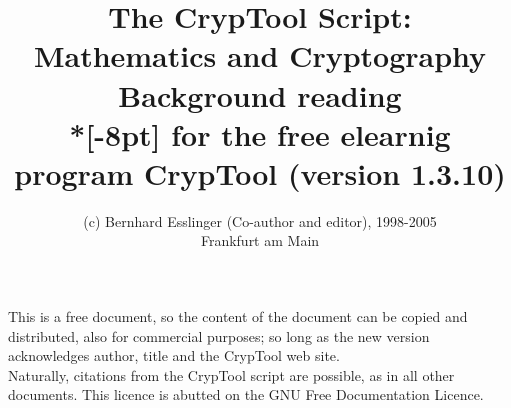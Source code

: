 \documentclass[a4paper,11pt]{article}
\title{ 
	The CrypTool Script: \\
	Mathematics and Cryptography \\
        \vspace{30pt}
        {\large	Background reading\\*[-8pt] 
        for the free elearnig program CrypTool (version 1.3.10)}
        \vspace{60pt}
}
\author{
(c) Bernhard Esslinger (Co-author and editor), 1998-2005 \\
Frankfurt am Main
}
\begin{document}
\pagestyle{plain}
\setlength{\fboxrule}{.5mm}
\setlength{\fboxsep}{1.75mm}
\setlength{\footnotesep}{6pt}
\addtolength{\footskip}{8pt}

\renewcommand\footnoterule{%
  \vspace{2em}%
  \hrule width .4\columnwidth
 \vspace{4pt}
}



\maketitle


\vspace{200pt}
This is a free document, so the content of the document can be copied and distributed,
also for commercial purposes; 
so long as the new version acknowledges author, title and the CrypTool web site. \\
Naturally, citations from the CrypTool script are possible, as in all other documents.
This licence is abutted on the GNU Free Documentation Licence.

\newpage


\newpage
\tableofcontents
{}

\newpage
\normalsize
\parindent 0cm
\parskip 4pt











\begin{appendix}
  \newpage
  
  
\end{appendix}


\printindex
\end{document}
